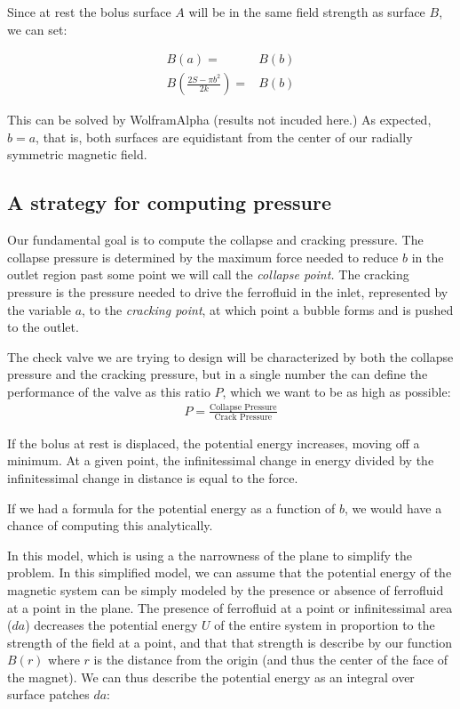 \documentclass[]{asme2ej}
\begin{document}
Since at rest the bolus surface $A$ will be in the same field strength as surface $B$, we can set:

\begin{align}
  B(a) = & B(b) \\
  B(\frac{2 S - \pi b^2 }{2k}) = & B(b)
\end{align}


This can be solved by WolframAlpha (results not incuded here.)
As expected, $ b = a $, that is, both surfaces are equidistant from the
center of our radially symmetric magnetic field.

\subsection{A strategy for computing pressure}

Our fundamental goal is to compute the collapse and cracking
pressure. The collapse pressure is determined by the maximum force needed
to reduce $b$ in the outlet region past some point we will call the
{\em collapse point.}
The cracking pressure is the pressure needed to drive the ferrofluid in the inlet,
represented
by the variable $a$, to the {\em cracking point}, at which point
a bubble forms and is pushed to the outlet.

The check valve we are trying to design will be characterized by
both the collapse pressure and the cracking pressure, but in a single
number the can define the performance of the valve as this ratio $P$,
which we want to be as high as possible:
\begin{align}
  P = \frac{\text{Collapse Pressure}}{\text{Crack Pressure}}
  \end{align}

If the bolus at rest is displaced, the potential energy increases,
moving off a minimum. At a given point, the infinitessimal change
in energy divided by the infinitessimal change in distance
is equal to the force.

If we had a formula for the potential energy as a function of $b$,
we would have a chance of computing this analytically.

In this model, which is using a the narrowness of the plane to simplify
the problem. In this simplified model, we can assume
that the potential energy of the magnetic system can be simply
modeled by the presence or absence of ferrofluid at a point in the plane.
The presence of ferrofluid at a point or infinitessimal area ($da$) decreases the potential energy $U$
of the entire system in proportion to the strength of the field at a point,
and that that strength is describe by our function $B(r)$ where $r$ is the
distance from the origin (and thus the center of the face of the magnet).
We can thus describe the potential energy as an integral over surface patches $da$:
\end{document}
